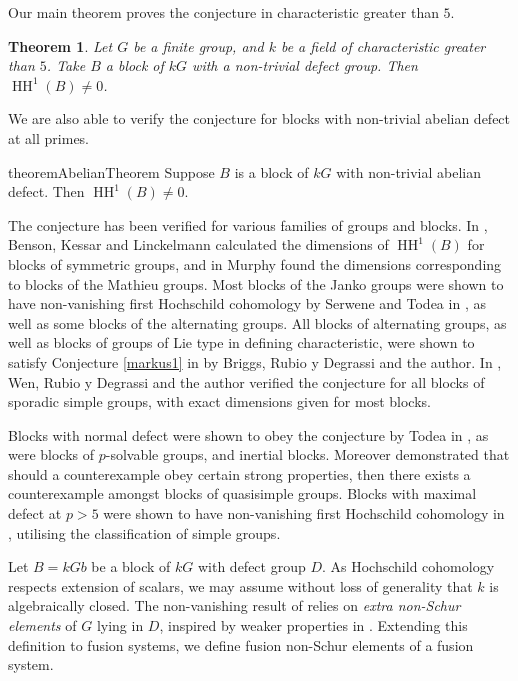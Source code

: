 \documentclass{amsart}
\theoremstyle{plain}\newtheorem{theorem}{Theorem}[section]
\theoremstyle{plain}\newtheorem{conjecture}[theorem]{Conjecture}
\theoremstyle{plain}\newtheorem{corollary}[theorem]{Corollary}
\theoremstyle{plain}\newtheorem{lemma}[theorem]{Lemma}
\theoremstyle{plain}\newtheorem{proposition}[theorem]{Proposition}
\theoremstyle{plain}\newtheorem{statement}[theorem]{}
\theoremstyle{definition}\newtheorem{definition}[theorem]{Definition}
\theoremstyle{definition}\newtheorem{example}[theorem]{Example}
\theoremstyle{definition}\newtheorem{examples}[theorem]{Examples}
\theoremstyle{definition}\newtheorem{notation}[theorem]{Notation}
\theoremstyle{definition}\newtheorem{remark}[theorem]{Remark}
\theoremstyle{definition}\newtheorem{remarks}[theorem]{Remarks}
\theoremstyle{definition}\newtheorem{question}[theorem]{Question}
\theoremstyle{definition}\newtheorem{propositiondefinition}[theorem]{Definition/Proposition}
\DeclareMathOperator{\HH}{HH}
\begin{document}
Our main theorem proves the conjecture in characteristic greater than $5$.

\begin{theorem}\label{nonvanishing}
    Let $G$ be a finite group, and $k$ be a field of characteristic greater than $5$. Take $B$ a block of $kG$ with a non-trivial defect group. Then $\HH^1(B)\not=0$. 
\end{theorem}

We are also able to verify the conjecture for blocks with non-trivial abelian defect at all primes.

\begin{restatable}{theorem}{AbelianTheorem}\label{AbelianTheorem} Suppose $B$ is a block of $kG$ with non-trivial abelian defect. Then $\HH^1(B)\not=0$.
\end{restatable}

The conjecture has been verified for various families of groups and blocks. In \cite[Theorem 1.2]{BKL2}, Benson, Kessar and Linckelmann calculated the dimensions of $\HH^1(B)$ for blocks of symmetric groups, and in \cite[Theorem 1.1]{Murphy2} Murphy found the dimensions corresponding to blocks of the Mathieu groups. Most blocks of the Janko groups were shown to have non-vanishing first Hochschild cohomology by Serwene and Todea in \cite[Theorem 1.6]{Todea2}, as well as some blocks of the alternating groups. All blocks of alternating groups, as well as blocks of groups of Lie type in defining characteristic, were shown to satisfy Conjecture \ref{markus1} in \cite[Theorem B]{BR} by Briggs, Rubio y Degrassi and the author. In \cite[Theorem A]{WLA}, Wen, Rubio y Degrassi and the author verified the conjecture for all blocks of sporadic simple groups, with exact dimensions given for most blocks.

Blocks with normal defect were shown to obey the conjecture by Todea in \cite[Corollary 1.4]{Todea1}, as were blocks of $p$-solvable groups, and inertial blocks. Moreover \cite[Theorem 1.5]{Todea2} demonstrated that should a counterexample obey certain strong properties, then there exists a counterexample amongst blocks of quasisimple groups. Blocks with maximal defect at $p>5$ were shown to have non-vanishing first Hochschild cohomology in \cite{BR}, utilising the classification of simple groups. 



Let $B=kGb$ be a block of $kG$ with defect group $D$. As Hochschild cohomology respects extension of scalars, we may assume without loss of generality that $k$ is algebraically closed. The non-vanishing result of \cite{BR} relies on \emph{extra non-Schur elements} of $G$ lying in $D$, inspired by weaker properties in \cite{FJL}. Extending this definition to fusion systems, we define fusion non-Schur elements of a fusion system.
\end{document}
